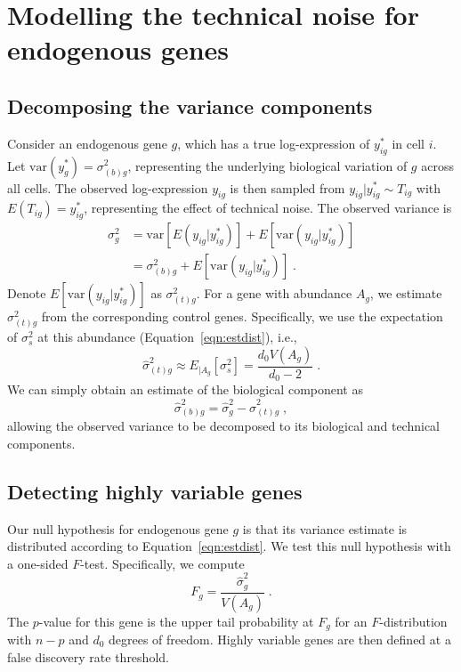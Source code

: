 \documentclass{article}
\begin{document}
\section{Modelling the technical noise for endogenous genes}

\subsection{Decomposing the variance components}
Consider an endogenous gene $g$, which has a true log-expression of $y_{ig}^*$ in cell $i$.
Let $\mbox{var}(y_{g}^*) = \sigma^2_{(b)g}$, representing the underlying biological variation of $g$ across all cells.
The observed log-expression $y_{ig}$ is then sampled from $y_{ig}|y_{ig}^* \sim T_{ig}$ with $E(T_{ig}) = y^*_{ig}$, representing the effect of technical noise.
The observed variance is 
\begin{align*}
    \sigma^2_g &= \mbox{var}[E(y_{ig}|y_{ig}^*)] + E[\mbox{var}(y_{ig}|y_{ig}^*)] \\
               &= \sigma^2_{(b)g} +  E[\mbox{var}(y_{ig}|y_{ig}^*)]  \;.
\end{align*}
Denote $E[\mbox{var}(y_{ig}|y_{ig}^*)]$ as $\sigma^2_{(t)g}$.
For a gene with abundance $A_g$, we estimate $\sigma^2_{(t)g}$ from the corresponding control genes.
Specifically, we use the expectation of $\sigma^2_s$ at this abundance (Equation~\ref{eqn:estdist}), i.e., 
\begin{equation}
    \hat\sigma^2_{(t)g} \approx E_{|A_g}[\sigma^2_s] = \frac{d_0V(A_g)}{d_0-2} \;. \label{eqn:techest}
\end{equation}
We can simply obtain an estimate of the biological component as
\[
    \hat\sigma^2_{(b)g} = \hat\sigma^2_g - \hat\sigma^2_{(t)g} \;,
\]
allowing the observed variance to be decomposed to its biological and technical components.

\subsection{Detecting highly variable genes}
Our null hypothesis for endogenous gene $g$ is that its variance estimate is distributed according to Equation~\ref{eqn:estdist}.
We test this null hypothesis with a one-sided $F$-test.
Specifically, we compute
\[
    F_g = \frac{\hat\sigma^2_g}{V(A_g)} \;.
\]
The $p$-value for this gene is the upper tail probability at $F_g$ for an $F$-distribution with $n-p$ and $d_0$ degrees of freedom.
Highly variable genes are then defined at a false discovery rate threshold.
\end{document}
